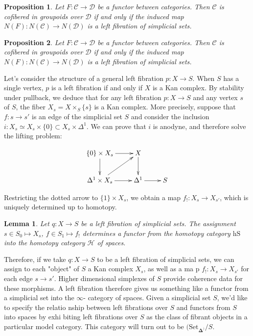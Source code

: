 \documentclass[a4paper, 12pt]{amsart}
\newcommand{\8}{\infty}
\newcommand{\SSet}[1]{\text{Set}_\boldsymbol{\Delta^{#1}}}
\newcommand{\HCal}{\mathcal{H}}
\newtheorem{lemma}{Lemma}
\newtheorem{proposition}{Proposition}
\begin{document}
\begin{proposition}
  Let $F:\mathcal{C}\rightarrow\mathcal{D}$ be a functor between categories. Then $\mathcal{C}$ is cofibered in groupoids over $\mathcal{D}$  if and only if the induced map $N(F):N(\mathcal{C})\rightarrow N(\mathcal{D})$ is a left fibration of simplicial sets.
\end{proposition}


\begin{proposition}
  Let $F:\mathcal{C}\rightarrow\mathcal{D}$ be a functor between categories. Then $\mathcal{C}$ is cofibered in groupoids over $\mathcal{D}$  if and only if the induced map $N(F):N(\mathcal{C})\rightarrow N(\mathcal{D})$ is a left fibration of simplicial sets.
\end{proposition}

Let's consider the structure of a general left fibration $p:X\rightarrow S$. When $S$ has a single vertex, $p$ is a left fibration if and only if $X$ is a Kan complex. By stability under pullback, we deduce that for any left fibration $p:X\rightarrow S$ and any vertex $s$ of $S$, the fiber $X_s = X\times_S\{s\}$ is a Kan complex. More precisely, suppose that $f:s\rightarrow s'$ is an edge of the simplicial set $S$
and consider the inclusion $i:X_s\simeq X_s\times\{0\} \subset X_s\times \Delta^1$. We can prove that $i$ is anodyne, and therefore solve the lifting problem:

$$
  \begin{xy}
    \xymatrix{
      \{0\}\times X_s\ar[r]\ar[d] & X \ar[d] &\\
      \Delta^1\times X_s\ar[r]\ar[ur] & \Delta^1\ar[r] & S
    }
  \end{xy}
$$

Restricting the dotted arrow to $\{1\}\times X_s$, we obtain a map $f_!:X_s\rightarrow X_{s'}$, which is uniquely determined up to homotopy.


\begin{lemma}
  Let $q : X \rightarrow S$ be a left fibration of simplicial sets. The assignment $s \in S_0 \mapsto X_s$, $f \in S_1 \mapsto f_!$ determines a functor from the homotopy category $\text{hS}$ into the homotopy category $\HCal$ of spaces.
\end{lemma}

Therefore, if we take $q:X\rightarrow S$ to be a left fibration of simplicial sets, we can assign to each "object" of $S$ a Kan complex $X_s$, as well as a ma p $f_!:X_s\rightarrow X_{s'}$ for each edge $s\rightarrow s'$. Higher dimensional simplexes of $S$ provide coherence data for these morphisms. A left fibration therefore gives us something like a functor from a simplicial set into the $\8$- category of spaces. Given a simplicial set $S$, we'd like to specify the relatio nship between left fibrations over $S$ and functors from $S$ into spaces by exhi biting left fibrations over $S$ as the class of fibrant objects in a particular model category. This category will turn out to be $(\SSet)/S$.
\end{document}
